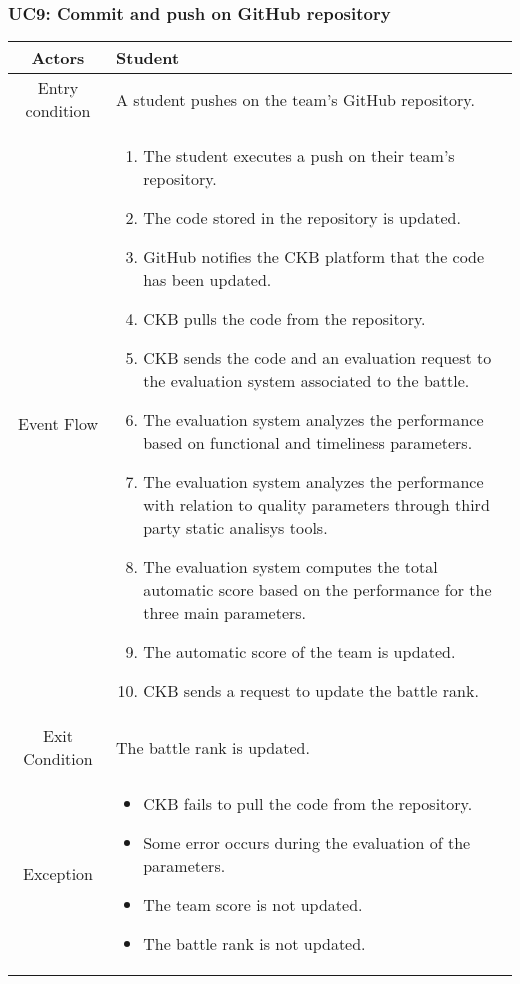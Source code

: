 \documentclass[a4paper, 11pt, titlepage]{article}
\begin{document}
\subsubsection*{UC9: Commit and push on GitHub repository}

\begin{center}
    \begin{tabularx}{\linewidth} {|c|X|}
        \hline 
        Actors & Student\\
        \hline 
        Entry condition &
        A student pushes on the team's GitHub repository.\\
        \hline 
        Event Flow &
        \begin{enumerate}
            \item The student executes a push on their team's repository.
            \item The code stored in the repository is updated.
            \item GitHub notifies the CKB platform that the code has been updated.
            \item CKB pulls the code from the repository.
            \item CKB sends the code and an evaluation request to the evaluation system associated to the battle.
            \item The evaluation system analyzes the performance based on functional and timeliness parameters.
            \item The evaluation system analyzes the performance with relation to quality parameters through third party static analisys tools.
            \item The evaluation system computes the total automatic score based on the performance for the three main parameters.
            \item The automatic score of the team is updated.
            \item CKB sends a request to update the battle rank.  
        \end{enumerate}\\
        \hline 
        Exit Condition &
        The battle rank is updated.\\
        \hline 
        Exception &
        \begin{itemize}
            \item CKB fails to pull the code from the repository.
            \item Some error occurs during the evaluation of the parameters.
            \item The team score is not updated.
            \item The battle rank is not updated.
        \end{itemize} \\
        \hline
    \end{tabularx}
\end{center}
\end{document}
